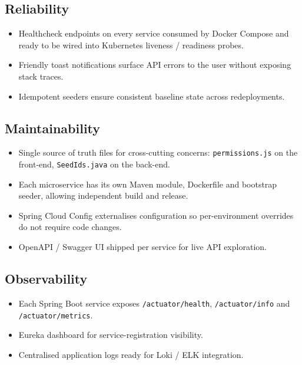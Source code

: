 \documentclass[12pt,a4paper,oneside]{report}
\begin{document}
\subsection*{Reliability}
\begin{itemize}[leftmargin=*]
  \item Healthcheck endpoints on every service consumed by Docker
        Compose and ready to be wired into Kubernetes liveness /
        readiness probes.
  \item Friendly toast notifications surface API errors to the user
        without exposing stack traces.
  \item Idempotent seeders ensure consistent baseline state across
        redeployments.
\end{itemize}

\subsection*{Maintainability}
\begin{itemize}[leftmargin=*]
  \item Single source of truth files for cross-cutting concerns:
        \texttt{permissions.js} on the front-end,
        \texttt{SeedIds.java} on the back-end.
  \item Each microservice has its own Maven module, Dockerfile and
        bootstrap seeder, allowing independent build and release.
  \item Spring Cloud Config externalises configuration so per-environment
        overrides do not require code changes.
  \item OpenAPI / Swagger UI shipped per service for live API
        exploration.
\end{itemize}

\subsection*{Observability}
\begin{itemize}[leftmargin=*]
  \item Each Spring Boot service exposes
        \texttt{/actuator/health}, \texttt{/actuator/info} and
        \texttt{/actuator/metrics}.
  \item Eureka dashboard for service-registration visibility.
  \item Centralised application logs ready for Loki / ELK
        integration.
\end{itemize}

\iffalse
\end{document}
